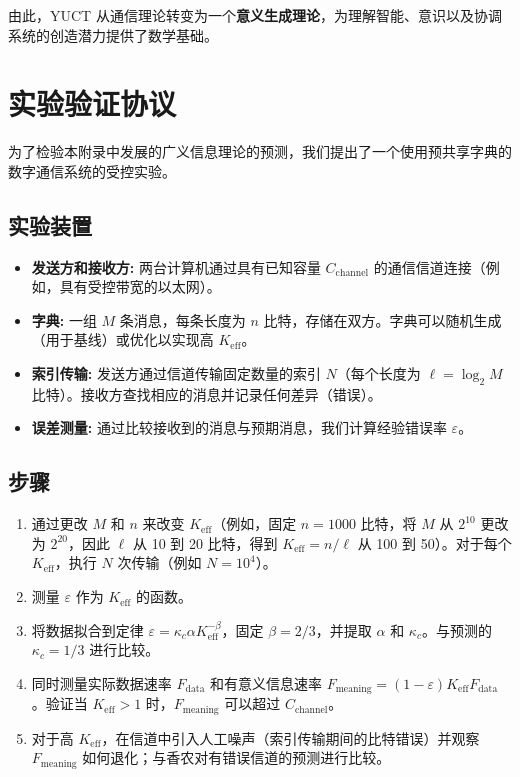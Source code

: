 \documentclass[12pt,a4paper]{article}
\theoremstyle{remark}
\newcommand{\Keff}{K_{\mathrm{eff}}}
\begin{document}
	由此，YUCT 从通信理论转变为一个\textbf{意义生成理论}，为理解智能、意识以及协调系统的创造潜力提供了数学基础。
	
	\section{实验验证协议}
	\label{sec:experiment}
	
	为了检验本附录中发展的广义信息理论的预测，我们提出了一个使用预共享字典的数字通信系统的受控实验。
	
	\subsection{实验装置}
	
	\begin{itemize}
		\item \textbf{发送方和接收方:} 两台计算机通过具有已知容量 $C_{\text{channel}}$ 的通信信道连接（例如，具有受控带宽的以太网）。
		\item \textbf{字典:} 一组 $M$ 条消息，每条长度为 $n$ 比特，存储在双方。字典可以随机生成（用于基线）或优化以实现高 $\Keff$。
		\item \textbf{索引传输:} 发送方通过信道传输固定数量的索引 $N$（每个长度为 $\ell = \log_2 M$ 比特）。接收方查找相应的消息并记录任何差异（错误）。
		\item \textbf{误差测量:} 通过比较接收到的消息与预期消息，我们计算经验错误率 $\varepsilon$。
	\end{itemize}
	
	\subsection{步骤}
	
	\begin{enumerate}
		\item 通过更改 $M$ 和 $n$ 来改变 $\Keff$（例如，固定 $n=1000$ 比特，将 $M$ 从 $2^{10}$ 更改为 $2^{20}$，因此 $\ell$ 从 10 到 20 比特，得到 $\Keff = n/\ell$ 从 100 到 50）。对于每个 $\Keff$，执行 $N$ 次传输（例如 $N=10^4$）。
		\item 测量 $\varepsilon$ 作为 $\Keff$ 的函数。
		\item 将数据拟合到定律 $\varepsilon = \kappa_c \alpha K_{\mathrm{eff}}^{-\beta}$，固定 $\beta=2/3$，并提取 $\alpha$ 和 $\kappa_c$。与预测的 $\kappa_c=1/3$ 进行比较。
		\item 同时测量实际数据速率 $F_{\text{data}}$ 和有意义信息速率 $F_{\text{meaning}} = (1-\varepsilon) \Keff F_{\text{data}}$。验证当 $\Keff>1$ 时，$F_{\text{meaning}}$ 可以超过 $C_{\text{channel}}$。
		\item 对于高 $\Keff$，在信道中引入人工噪声（索引传输期间的比特错误）并观察 $F_{\text{meaning}}$ 如何退化；与香农对有错误信道的预测进行比较。
	\end{enumerate}
	
\end{document}
